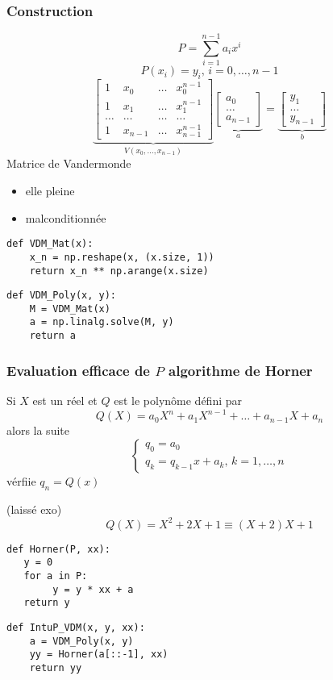 \subsubsection{Construction}
\[
P = \sum_{i=1}^{n-1} a_ix^i
\] 
\[
P(x_i) = y_i, \, i = 0, \ldots, n-1
\] 
\[
    \underbrace{
        \begin{bmatrix} 
            1 & x_0 & \ldots & x_0^{n-1}\\
            1 & x_1 & \ldots & x_1^{n-1}\\
            \ldots & \ldots & \ldots & \ldots\\
            1 & x_{n-1} & \ldots & x_{n-1}^{n-1}
        \end{bmatrix} 
    }_{V(x_0, \ldots, x_{n-1})} \underbrace{\begin{bmatrix} a_0 \\ \ldots \\ a_{n-1} \end{bmatrix} }_{a} 
    =
    \underbrace{\begin{bmatrix} y_1 \\ \ldots \\ y_{n-1} \end{bmatrix} }_{b}
\] 
Matrice de Vandermonde
\begin{itemize}
    \item elle pleine
    \item malconditionnée
\end{itemize}
\begin{lstlisting}
def VDM_Mat(x):
    x_n = np.reshape(x, (x.size, 1))
    return x_n ** np.arange(x.size)
\end{lstlisting}
\begin{lstlisting}
def VDM_Poly(x, y):
    M = VDM_Mat(x)
    a = np.linalg.solve(M, y)
    return a
\end{lstlisting}
\subsubsection{Evaluation efficace de $P$ algorithme de Horner}
\begin{prop}
   Si $X$ est un réel et  $Q$ est le polynôme défini par 
   \[
       Q(X) = a_0X^n + a_1X^{n-1} + \ldots + a_{n-1}X + a_n
   \] 
   alors la suite
   \[
   \begin{cases}
       q_0 = a_0\\
       q_k = q_{k-1}x + a_k, \, k=1,\ldots,n
   \end{cases}
   \] 
   vérfiie $q_n = Q(x)$
\end{prop}
\begin{preuve}
    (laissé exo)
    \[
    Q(X) = X^2 + 2X + 1 \equiv (X+2)X + 1
    \] 
\end{preuve}
\begin{lstlisting}
def Horner(P, xx): 
   y = 0
   for a in P:
        y = y * xx + a
   return y
\end{lstlisting}
\begin{lstlisting}
def IntuP_VDM(x, y, xx):
    a = VDM_Poly(x, y)
    yy = Horner(a[::-1], xx)
    return yy
\end{lstlisting}
